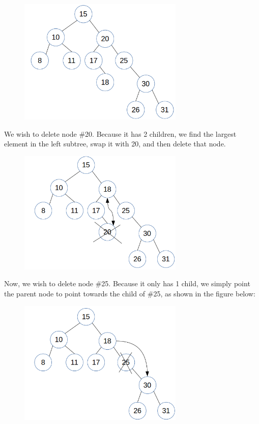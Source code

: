 \documentclass{article}
\begin{document}
\begin{enumerate}
\begin{figure}[H]

	\includegraphics[width=0.7\textwidth]{P11/full}
\end{figure}



We wish to delete node \#20. Because it has 2 children, we find the largest element in the left subtree, swap it with 20, and then delete that node. 
 
\begin{figure}[H]
	\includegraphics[width=0.7\textwidth]{P11/20}
\end{figure}


Now, we wish to delete node \#25. Because it only has 1 child, we simply point the parent node to point towards the child of \#25, as shown in the figure below: 

\begin{figure}[H]
	\includegraphics[width=0.7\textwidth]{P11/25}
\end{figure}


\end{enumerate}
\end{document}
